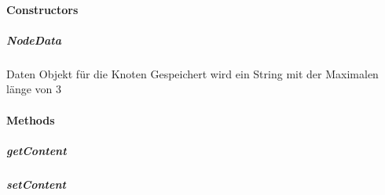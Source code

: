 \documentclass[letterpaper,10pt,ngerman]{sphinxmanual}
\begin{document}
\paragraph{Constructors}
\label{\detokenize{com/linuxluigi/edu/data/NodeData:constructors}}

\subparagraph{NodeData}
\label{\detokenize{com/linuxluigi/edu/data/NodeData:id1}}

\begin{fulllineitems}
\label{\detokenize{com/linuxluigi/edu/data/NodeData:com.linuxluigi.edu.data.NodeData.NodeData(String)}}
Daten Objekt für die Knoten Gespeichert wird ein String mit der Maximalen länge von 3

\end{fulllineitems}



\paragraph{Methods}
\label{\detokenize{com/linuxluigi/edu/data/NodeData:methods}}

\subparagraph{getContent}
\label{\detokenize{com/linuxluigi/edu/data/NodeData:getcontent}}

\begin{fulllineitems}
\label{\detokenize{com/linuxluigi/edu/data/NodeData:com.linuxluigi.edu.data.NodeData.getContent()}}
\end{fulllineitems}



\subparagraph{setContent}
\label{\detokenize{com/linuxluigi/edu/data/NodeData:setcontent}}
\end{document}
